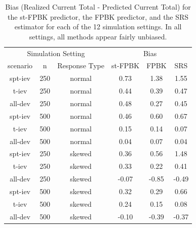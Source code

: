 \documentclass[]{interact}
\theoremstyle{plain}%
\theoremstyle{definition}
\theoremstyle{remark}
\begin{document}
\begin{table}[H]

\caption{\label{tab:simbiastab}Bias (Realized Current Total - Predicted Current Total) for the st-FPBK predictor, the FPBK predictor, and the SRS estimator for each of the 12 simulation settings. In all settings, all methods appear fairly unbiased.}
\centering
\begin{tabular}[t]{cccccc}
\toprule
\multicolumn{3}{c}{Simulation Setting} & \multicolumn{3}{c}{Bias} \\
\cmidrule(l{3pt}r{3pt}){1-3} \cmidrule(l{3pt}r{3pt}){4-6}
scenario & n & Response Type & st-FPBK & FPBK & SRS\\
\midrule
spt-iev & 250 & normal & 0.73 & 1.38 & 1.55\\
t-iev & 250 & normal & 0.44 & 0.39 & 0.47\\
all-dev & 250 & normal & 0.48 & 0.27 & 0.45\\
\midrule
spt-iev & 500 & normal & 0.46 & 0.60 & 0.67\\
t-iev & 500 & normal & 0.15 & 0.14 & 0.07\\
all-dev & 500 & normal & 0.04 & 0.07 & 0.04\\
\midrule
spt-iev & 250 & skewed & 0.36 & 0.56 & 1.48\\
t-iev & 250 & skewed & 0.33 & 0.22 & 0.41\\
all-dev & 250 & skewed & -0.07 & -0.85 & -0.49\\
\midrule
spt-iev & 500 & skewed & 0.32 & 0.29 & 0.66\\
t-iev & 500 & skewed & 0.24 & 0.15 & 0.08\\
all-dev & 500 & skewed & -0.10 & -0.39 & -0.37\\
\bottomrule
\end{tabular}
\end{table}
\end{document}
